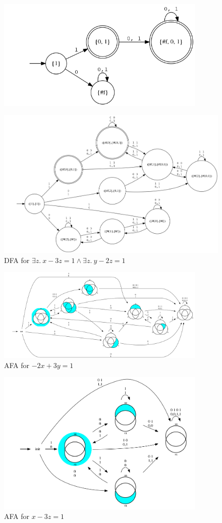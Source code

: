 \begin{example}
\begin{figure}
    \includegraphics[width=10cm]{images/proj_odd_x.png}
  \end{figure}
  \begin{figure}
    \caption{DFA for \( \exists z.\ x -3z = 1 \wedge \exists z.\ y -2z = 1 \)}
    \includegraphics[width=12cm]{images/conjunction.png}
  \end{figure}
  \begin{figure}
    \caption{AFA for \( -2 x + 3y = 1 \)}
    \includegraphics[width=10cm]{images/afa_eq5.png}
  \end{figure}
  \begin{figure}
    \caption{AFA for \( x -3z = 1 \)}
    \includegraphics[width=10cm]{images/afa_mod3is1_x.png}

\end{figure}
\end{example}
